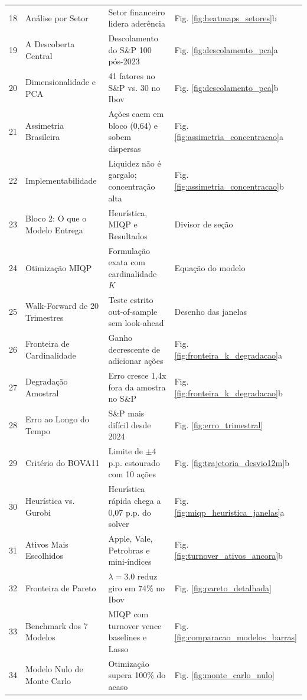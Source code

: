 \documentclass[11pt,a4paper]{article}
\begin{document}
\begin{longtable}{c p{} p{} p{}}
18 & Análise por Setor & Setor financeiro lidera aderência & Fig. \ref{fig:heatmaps_setores}b \\
19 & A Descoberta Central & Descolamento do S\&P 100 pós-2023 & Fig. \ref{fig:descolamento_pca}a \\
20 & Dimensionalidade e PCA & 41 fatores no S\&P vs. 30 no Ibov & Fig. \ref{fig:descolamento_pca}b \\
21 & Assimetria Brasileira & Ações caem em bloco (0,64) e sobem dispersas & Fig. \ref{fig:assimetria_concentracao}a \\
22 & Implementabilidade & Liquidez não é gargalo; concentração alta & Fig. \ref{fig:assimetria_concentracao}b \\
23 & Bloco 2: O que o Modelo Entrega & Heurística, MIQP e Resultados & Divisor de seção \\
24 & Otimização MIQP & Formulação exata com cardinalidade $K$ & Equação do modelo \\
25 & Walk-Forward de 20 Trimestres & Teste estrito out-of-sample sem look-ahead & Desenho das janelas \\
26 & Fronteira de Cardinalidade & Ganho decrescente de adicionar ações & Fig. \ref{fig:fronteira_k_degradacao}a \\
27 & Degradação Amostral & Erro cresce 1,4x fora da amostra no S\&P & Fig. \ref{fig:fronteira_k_degradacao}b \\
28 & Erro ao Longo do Tempo & S\&P mais difícil desde 2024 & Fig. \ref{fig:erro_trimestral} \\
29 & Critério do BOVA11 & Limite de $\pm 4$ p.p. estourado com 10 ações & Fig. \ref{fig:trajetoria_desvio12m}b \\
30 & Heurística vs. Gurobi & Heurística rápida chega a 0,07 p.p. do solver & Fig. \ref{fig:miqp_heuristica_janelas}a \\
31 & Ativos Mais Escolhidos & Apple, Vale, Petrobras e mini-índices & Fig. \ref{fig:turnover_ativos_ancora}b \\
32 & Fronteira de Pareto & $\lambda = 3.0$ reduz giro em 74\% no Ibov & Fig. \ref{fig:pareto_detalhada} \\
33 & Benchmark dos 7 Modelos & MIQP com turnover vence baselines e Lasso & Fig. \ref{fig:comparacao_modelos_barras} \\
34 & Modelo Nulo de Monte Carlo & Otimização supera 100\% do acaso & Fig. \ref{fig:monte_carlo_nulo} \\
\bottomrule
\end{longtable}

\newpage
\end{document}
